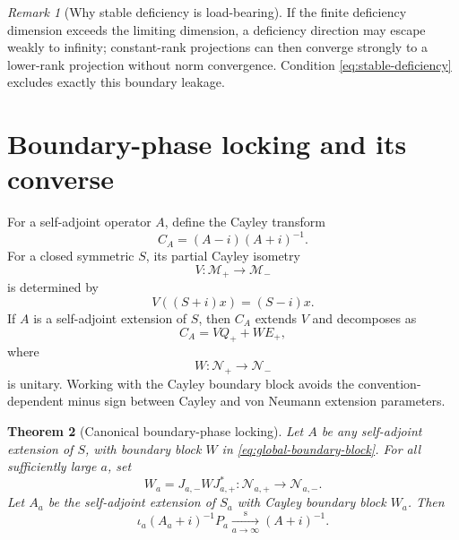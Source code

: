 \documentclass[11pt]{article}
\newtheorem{theorem}{Theorem}[section]
\theoremstyle{remark}
\newtheorem{remark}[theorem]{Remark}
\begin{document}
\begin{remark}[Why stable deficiency is load-bearing]
If the finite deficiency dimension exceeds the limiting dimension, a deficiency direction may
escape weakly to infinity; constant-rank projections can then converge strongly to a lower-rank
projection without norm convergence.  Condition \eqref{eq:stable-deficiency} excludes exactly this
boundary leakage.
\end{remark}

\section{Boundary-phase locking and its converse}\label{sec:phase}

For a self-adjoint operator $A$, define the Cayley transform
\begin{equation}\label{eq:Cayley}
 C_A=(A-i)(A+i)^{-1}.
\end{equation}
For a closed symmetric $S$, its partial Cayley isometry
\[
 V:\mathcal M_+\longrightarrow\mathcal M_-
\]
is determined by
\begin{equation}\label{eq:partial-Cayley}
 V((S+i)x)=(S-i)x.
\end{equation}
If $A$ is a self-adjoint extension of $S$, then $C_A$ extends $V$ and decomposes as
\begin{equation}\label{eq:Cayley-block}
 C_A=VQ_+ + WE_+,
\end{equation}
where
\begin{equation}\label{eq:global-boundary-block}
 W:\mathcal N_+\longrightarrow\mathcal N_-
\end{equation}
is unitary.  Working with the Cayley boundary block avoids the convention-dependent minus sign
between Cayley and von Neumann extension parameters.

\begin{theorem}[Canonical boundary-phase locking]\label{thm:phase-lock-existence}
Let $A$ be any self-adjoint extension of $S$, with boundary block $W$ in
\eqref{eq:global-boundary-block}.  For all sufficiently large $a$, set
\begin{equation}\label{eq:locked-boundary}
 W_a=J_{a,-}WJ_{a,+}^*:
 \mathcal N_{a,+}\longrightarrow\mathcal N_{a,-}.
\end{equation}
Let $A_a$ be the self-adjoint extension of $S_a$ with Cayley boundary block $W_a$.  Then
\begin{equation}\label{eq:main-GSRC}
 \iota_a(A_a+i)^{-1}P_a
 \xrightarrow[a\to\infty]{\mathrm{s}}
 (A+i)^{-1}.
\end{equation}
\end{theorem}
\end{document}
